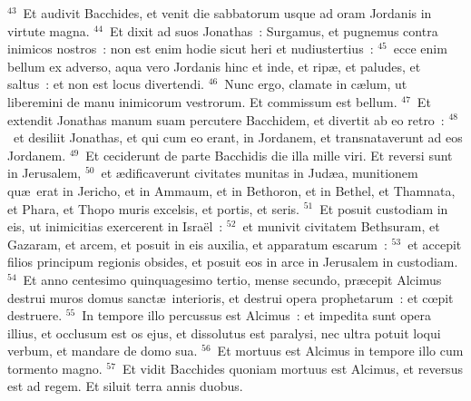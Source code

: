 ${}^{43}$~Et audivit Bacchides, et venit die sabbatorum usque ad oram Jordanis in virtute magna.
${}^{44}$~Et dixit ad suos Jonathas~: Surgamus, et pugnemus contra inimicos nostros~: non est enim hodie sicut heri et nudiustertius~:
${}^{45}$~ecce enim bellum ex adverso, aqua vero Jordanis hinc et inde, et rip\ae , et paludes, et saltus~: et non est locus divertendi.
${}^{46}$~Nunc ergo, clamate in c\ae lum, ut liberemini de manu inimicorum vestrorum. Et commissum est bellum.
${}^{47}$~Et extendit Jonathas manum suam percutere Bacchidem, et divertit ab eo retro~:
${}^{48}$~et desiliit Jonathas, et qui cum eo erant, in Jordanem, et transnataverunt ad eos Jordanem.
${}^{49}$~Et ceciderunt de parte Bacchidis die illa mille viri. Et reversi sunt in Jerusalem,
${}^{50}$~et \ae dificaverunt civitates munitas in Jud\ae a, munitionem qu\ae\ erat in Jericho, et in Ammaum, et in Bethoron, et in Bethel, et Thamnata, et Phara, et Thopo muris excelsis, et portis, et seris.
${}^{51}$~Et posuit custodiam in eis, ut inimicitias exercerent in Isra\"el~:
${}^{52}$~et munivit civitatem Bethsuram, et Gazaram, et arcem, et posuit in eis auxilia, et apparatum escarum~:
${}^{53}$~et accepit filios principum regionis obsides, et posuit eos in arce in Jerusalem in custodiam.
${}^{54}$~Et anno centesimo quinquagesimo tertio, mense secundo, pr\ae cepit Alcimus destrui muros domus sanct\ae\ interioris, et destrui opera prophetarum~: et cœpit destruere.
${}^{55}$~In tempore illo percussus est Alcimus~: et impedita sunt opera illius, et occlusum est os ejus, et dissolutus est paralysi, nec ultra potuit loqui verbum, et mandare de domo sua.
${}^{56}$~Et mortuus est Alcimus in tempore illo cum tormento magno.
${}^{57}$~Et vidit Bacchides quoniam mortuus est Alcimus, et reversus est ad regem. Et siluit terra annis duobus.


